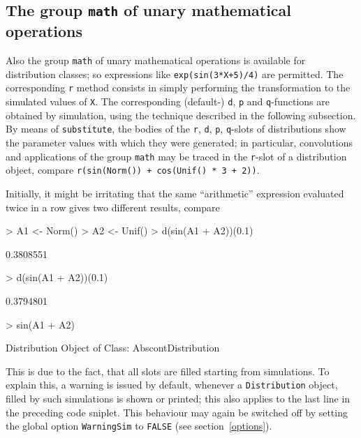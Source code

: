 \documentclass[11pt]{article}
\newcommand{\code}[1]{{\tt #1}}
\begin{document}
\subsection[The group math of unary mathematical operations]{The group \code{math} of unary mathematical operations}
%
Also the group \code{math} of unary mathematical operations is available for
distribution classes; so
expressions like \code{exp(sin(3*X+5)/4)} are permitted.
%
 The corresponding \code{r} method consists in simply
performing the transformation to the simulated values of \code{X}.
The corresponding (default-) \code{d}, \code{p} and \code{q}-functions are obtained by simulation, using the
technique described in the following subsection.\\
By means of \code{substitute}, the bodies of the \code{r}, \code{d}, \code{p}, \code{q}-slots
of distributions show the parameter values with which they were generated; in particular,
convolutions and applications of the group \code{math} may be traced in
the \code{r}-slot of a distribution object, compare\newline
\code{r(sin(Norm()) + cos(Unif() * 3 + 2))}.

Initially, it might be irritating that the same ``arithmetic'' expression
evaluated twice in a row gives two different results, compare
\begin{Schunk}
\begin{Sinput}
> A1 <- Norm()
> A2 <- Unif()
> d(sin(A1 + A2))(0.1)
\end{Sinput}
\begin{Soutput}
[1] 0.3808551
\end{Soutput}
\begin{Sinput}
> d(sin(A1 + A2))(0.1)
\end{Sinput}
\begin{Soutput}
[1] 0.3794801
\end{Soutput}
\begin{Sinput}
> sin(A1 + A2)
\end{Sinput}
\begin{Soutput}
Distribution Object of Class: AbscontDistribution
\end{Soutput}
\end{Schunk}
This is due to the fact, that all slots are filled starting from simulations.
To explain this, a warning is issued  by default, whenever a \code{Distribution}
object, filled by such simulations is shown or printed; this also applies to the last line in
the preceding code sniplet. This behaviour may again be switched off by setting the global option
\code{WarningSim} to \code{FALSE} (see section~\ref{options}).
\end{document}
